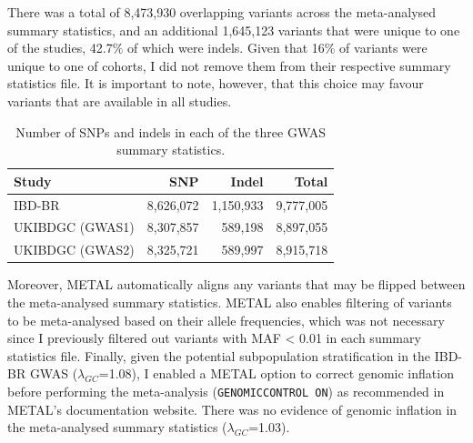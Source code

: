 There was a total of 8,473,930 overlapping variants across the meta-analysed summary statistics, and an additional 1,645,123 variants that were unique to one of the studies, 42.7\% of which were indels. Given that 16\% of variants were unique to one of cohorts, I did not remove them from their respective summary statistics file. It is important to note, however, that this choice may favour variants that are available in all studies. 

\begin{table}[H]
  \caption{Number of SNPs and indels in each of the three GWAS summary statistics.}
  \centering
  \begin{tabular}[t]{lrrr}
  \toprule
  \textbf{Study} & \textbf{SNP} & \textbf{Indel} & \textbf{Total}\\
  \midrule
  IBD-BR & 8,626,072 & 1,150,933 & 9,777,005\\
  UKIBDGC (GWAS1) & 8,307,857 & 589,198 & 8,897,055\\
  UKIBDGC (GWAS2) & 8,325,721 & 589,997 & 8,915,718\\
  \bottomrule
  \end{tabular}
  \end{table}

Moreover, METAL automatically aligns any variants that may be flipped between the meta-analysed summary statistics. METAL also enables filtering of variants to be meta-analysed based on their allele frequencies, which was not necessary since I previously filtered out variants with MAF < 0.01 in each summary statistics file. Finally, given the potential subpopulation stratification in the IBD-BR GWAS ($\lambda_{GC}$=1.08), I enabled a METAL option to correct genomic inflation before performing the meta-analysis (\Verb+GENOMICCONTROL ON+) as recommended in METAL's documentation website. There was no evidence of genomic inflation in the meta-analysed summary statistics ($\lambda_{GC}$=1.03).\\

